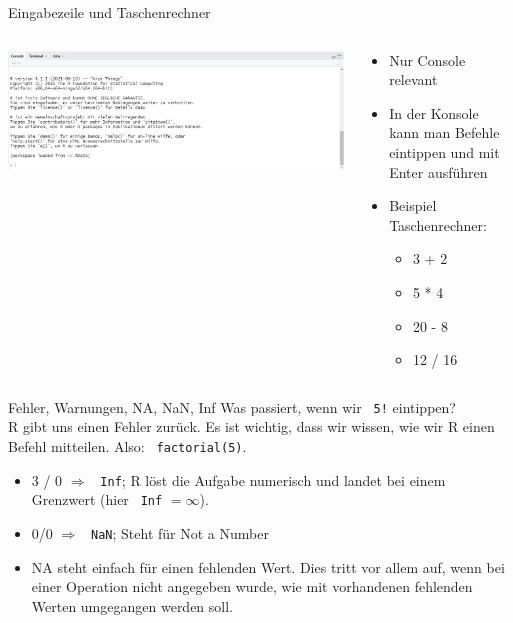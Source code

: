 \documentclass[aspectratio = 169]{chariteBeamer}
\begin{document}
\begin{frame}{Eingabezeile und Taschenrechner}
	\begin{columns}[T]
	\begin{column}{0.6\textwidth}
	\includegraphics[width=\textwidth]{Rstudio_interface_c}
	\end{column}
	\begin{column}{0.4\textwidth}
	\begin{itemize}
		\item Nur \glqq Console\grqq{} relevant
		\item In der Konsole kann man Befehle eintippen und  mit Enter ausführen
		\item Beispiel Taschenrechner:
		\begin{itemize}
			\item 3 + 2
			\item 5 * 4
			\item 20 - 8
			\item 12 / 16
		\end{itemize}
	\end{itemize}
	\end{column}
\end{columns}
\end{frame}

\begin{frame}[fragile]{Fehler, Warnungen, NA, NaN, Inf}
	Was passiert, wenn wir \verb+ 5!+ eintippen? \\
	R gibt uns einen Fehler zurück. Es ist wichtig, dass wir wissen, wie wir R einen Befehl mitteilen. Also: \verb+ factorial(5)+. \\
	\begin{itemize}
		\item 3 / 0 $\Rightarrow$ \verb+ Inf+; R löst die Aufgabe numerisch und landet bei einem Grenzwert (hier \verb+ Inf+ $=\infty$).
		\item 0/0 $\Rightarrow$ \verb+ NaN+; Steht für \glqq Not a Number\grqq{}
		\item NA steht einfach für einen fehlenden Wert. Dies tritt vor allem auf, wenn bei einer Operation nicht angegeben wurde, wie mit vorhandenen fehlenden Werten umgegangen werden soll.
		
	\end{itemize}

\end{frame}
\end{document}
